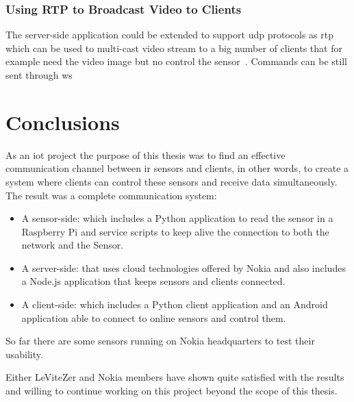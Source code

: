 \documentclass[hidelinks,11pt,a4paper,oneside,article]{memoir}
\begin{document}
\subsection*{Using RTP to Broadcast Video to Clients}
The server-side application could be extended to support \gls{udp} protocols as \gls{rtp} which can be used to multi-cast video stream to a big number of clients that for example need the video image but no control the sensor~\cite[298]{hardy2013networks}. Commands can be still sent through \gls{ws} 

\clearpage\chapter{Conclusions}
As an \gls{iot} project the purpose of this thesis was to find an effective communication channel between \gls{ir} sensors and clients, in other words, to create a system where clients can control these sensors and receive data simultaneously. The result was a complete communication system:
\begin{itemize}
	\item A sensor-side: which includes a Python application to read the sensor in a Raspberry Pi and service scripts to keep alive the connection to both the network and the Sensor.
	\item A server-side: that uses cloud technologies offered by Nokia and also includes a Node.js application that keeps sensors and clients connected.
	\item A client-side: which includes a Python client application and an Android application able to connect to online sensors and control them.
\end{itemize}
 So far there are some sensors running on Nokia headquarters to test their usability.
 
 Either LeViteZer and Nokia members have shown quite satisfied with the results and willing to continue working on this project beyond the scope of this thesis.
 
\end{document}
